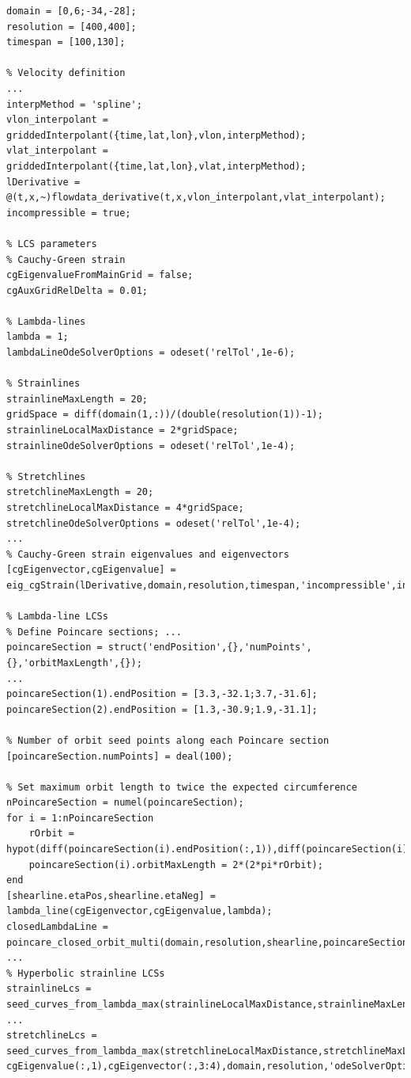 \documentclass{article}
\begin{document}
\begin{lstlisting}[caption={LCS ocean demo: Parts of the demo script included in LCS Tool to compute LCS from an ocean dataset},label=l:griddedInterp]
% Input parameters
domain = [0,6;-34,-28];
resolution = [400,400];
timespan = [100,130];

% Velocity definition
...
interpMethod = 'spline';
vlon_interpolant = griddedInterpolant({time,lat,lon},vlon,interpMethod);
vlat_interpolant = griddedInterpolant({time,lat,lon},vlat,interpMethod);
lDerivative = @(t,x,~)flowdata_derivative(t,x,vlon_interpolant,vlat_interpolant);
incompressible = true;

% LCS parameters
% Cauchy-Green strain
cgEigenvalueFromMainGrid = false;
cgAuxGridRelDelta = 0.01;

% Lambda-lines
lambda = 1;
lambdaLineOdeSolverOptions = odeset('relTol',1e-6);

% Strainlines
strainlineMaxLength = 20;
gridSpace = diff(domain(1,:))/(double(resolution(1))-1);
strainlineLocalMaxDistance = 2*gridSpace;
strainlineOdeSolverOptions = odeset('relTol',1e-4);

% Stretchlines
stretchlineMaxLength = 20;
stretchlineLocalMaxDistance = 4*gridSpace;
stretchlineOdeSolverOptions = odeset('relTol',1e-4);
...
% Cauchy-Green strain eigenvalues and eigenvectors
[cgEigenvector,cgEigenvalue] = eig_cgStrain(lDerivative,domain,resolution,timespan,'incompressible',incompressible,'eigenvalueFromMainGrid',cgEigenvalueFromMainGrid,'auxGridRelDelta',cgAuxGridRelDelta);

% Lambda-line LCSs
% Define Poincare sections; ...
poincareSection = struct('endPosition',{},'numPoints',{},'orbitMaxLength',{});
...
poincareSection(1).endPosition = [3.3,-32.1;3.7,-31.6];
poincareSection(2).endPosition = [1.3,-30.9;1.9,-31.1];

% Number of orbit seed points along each Poincare section
[poincareSection.numPoints] = deal(100);

% Set maximum orbit length to twice the expected circumference
nPoincareSection = numel(poincareSection);
for i = 1:nPoincareSection
    rOrbit = hypot(diff(poincareSection(i).endPosition(:,1)),diff(poincareSection(i).endPosition(:,2)));
    poincareSection(i).orbitMaxLength = 2*(2*pi*rOrbit);
end
[shearline.etaPos,shearline.etaNeg] = lambda_line(cgEigenvector,cgEigenvalue,lambda);
closedLambdaLine = poincare_closed_orbit_multi(domain,resolution,shearline,poincareSection,'odeSolverOptions',lambdaLineOdeSolverOptions);
...
% Hyperbolic strainline LCSs
strainlineLcs = seed_curves_from_lambda_max(strainlineLocalMaxDistance,strainlineMaxLength,cgEigenvalue(:,2),cgEigenvector(:,1:2),domain,resolution,'odeSolverOptions',strainlineOdeSolverOptions);
...
stretchlineLcs = seed_curves_from_lambda_max(stretchlineLocalMaxDistance,stretchlineMaxLength,-cgEigenvalue(:,1),cgEigenvector(:,3:4),domain,resolution,'odeSolverOptions',stretchlineOdeSolverOptions);
\end{lstlisting}
\end{document}
